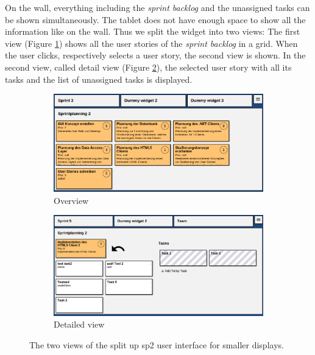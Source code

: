 \documentclass{sigchi}
\begin{document}
On the wall, everything including the \textit{sprint backlog} and the unassigned tasks can be shown simultaneously.
The tablet does not have enough space to show all the information like on the wall.
Thus we split the widget into two views:
The first view (Figure \ref{fig:sp2-overview}) shows all the user stories of the \textit{sprint backlog} in a grid.
When the user clicks, respectively selects a user story, the second view is shown.
In the second view, called detail view (Figure \ref{fig:sp2-detail}), the selected user story with all its tasks and the list of unassigned tasks is displayed.


\begin{figure}
	\centering
	\begin{subfigure}[b]{1\columnwidth}
		\includegraphics[width=\textwidth]{figures/sp2-overview}
		\caption{Overview}
		\label{fig:sp2-overview}
	\end{subfigure}%
	\quad
	\begin{subfigure}[b]{1\columnwidth}
		\includegraphics[width=\textwidth]{figures/sp2-detail}
		\caption{Detailed view}
		\label{fig:sp2-detail}
	\end{subfigure}
	
	\caption{The two views of the split up \gls{sp2} user interface for smaller displays.}\label{fig:sp2-smallscreen-views}
\end{figure}
\end{document}
